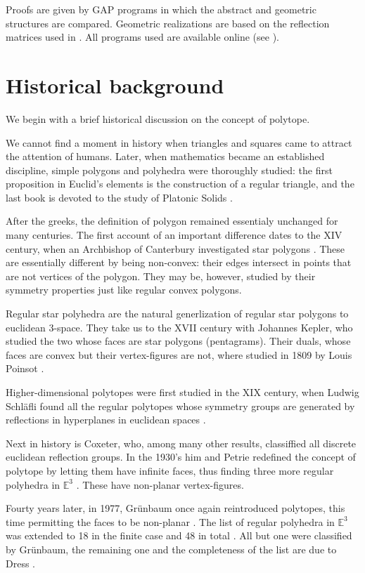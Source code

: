 \documentclass{article}
\theoremstyle{definition}
\newcommand{\E}{\mathbb{E}}
\begin{document}
	Proofs are given by GAP programs in which the abstract and geometric structures are compared. Geometric realizations are based on the reflection matrices used in \cite{petcox}. All programs used are available online (see ).
	
	\section{Historical background}
	We begin with a brief historical discussion on the concept of polytope.
	
	We cannot find a moment in history when triangles and squares came to attract the attention of humans. Later, when mathematics became an established discipline, simple polygons and polyhedra were thoroughly studied: the first proposition in Euclid's elements is the construction of a regular triangle, and the last book is devoted to the study of Platonic Solids \cite{euclid}.
	
	After the greeks, the definition of polygon remained essentialy unchanged for many centuries. The first account of an important difference dates to the XIV century, when an Archbishop of Canterbury investigated star polygons \cite{abstract-polytopes}.
	These are essentially different by being non-convex: their edges intersect in points that are not vertices of the polygon. They may be, however, studied by their symmetry properties just like regular convex polygons.
	
	Regular star polyhedra are the natural generlization of regular star polygons to euclidean 3-space. They take us to the XVII century with Johannes Kepler, who studied the two whose faces are star polygons (pentagrams). Their duals, whose faces are convex but their vertex-figures are not, where studied in 1809 by Louis Poinsot \cite{abstract-polytopes}.
	
	Higher-dimensional polytopes were first studied in the XIX century, when Ludwig Schläfli found all the regular polytopes whose symmetry groups are generated by reflections in hyperplanes in euclidean spaces \cite{abstract-polytopes}.
	
	Next in history is Coxeter, who, among many other results, classiffied all discrete euclidean reflection groups. In the 1930's him and Petrie redefined the concept of polytope by letting them have infinite faces, thus finding three more regular polyhedra in $\E^3$ \cite{regular-skew}. These have non-planar vertex-figures.
	
	Fourty years later, in 1977, Grünbaum once again reintroduced polytopes, this time permitting the faces to be non-planar \cite{grunbaum}. The list of regular polyhedra in $\E^3$ was extended to 18 in the finite case and 48 in total \cite{regular-ordinary}. All but one were classified by Grünbaum, the remaining one and the completeness of the list are due to Dress \cite{Dress1981,Dress1985}.
	
\end{document}
